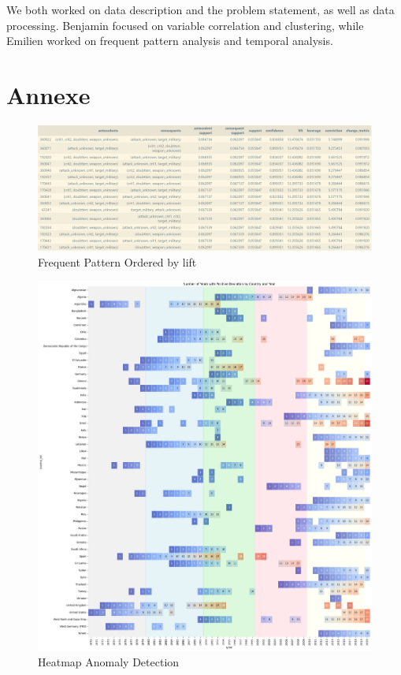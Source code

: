 \documentclass{article}
\begin{document}
We both worked on data description and the problem statement, as well as data processing. Benjamin focused on variable correlation and clustering, while Emilien worked on frequent pattern analysis and temporal analysis.

\section{Annexe}



\begin{figure}[!htb]
    \centering
    \includegraphics[width=0.8\linewidth]{img/FrequentPattern/fp_lift_1.png}
    \caption{Frequent Pattern Ordered by lift}
    \label{fig:fp_lift}
\end{figure}
\begin{figure}
    \centering
    \includegraphics[width=0.5\linewidth]{img/Anomaly/anomaly_detect_heatmap_50_country.png}
    \caption{Heatmap Anomaly Detection}
    \label{fig:anomaly_detect_heatmap}
\end{figure}
\end{document}
